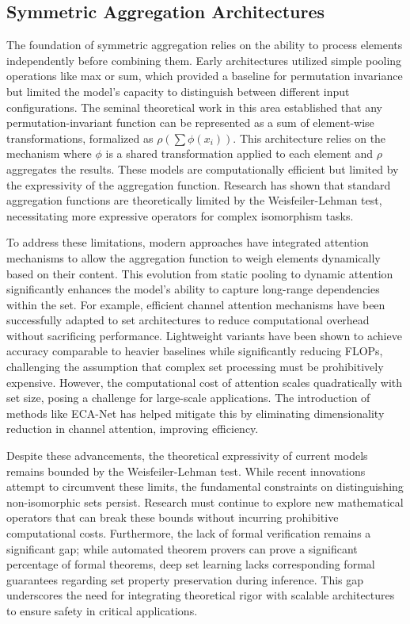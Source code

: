 \documentclass{article}
\begin{document}
\label{sec:detailed_review_of_approaches}

\subsection{Symmetric Aggregation Architectures}

\label{sec:symmetric_aggregation_architectures}

The foundation of symmetric aggregation relies on the ability to process elements independently before combining them. Early architectures utilized simple pooling operations like max or sum, which provided a baseline for permutation invariance but limited the model's capacity to distinguish between different input configurations. The seminal theoretical work in this area established that any permutation-invariant function can be represented as a sum of element-wise transformations, formalized as $\rho(\sum \phi(x_i))$. This architecture relies on the mechanism where $\phi$ is a shared transformation applied to each element and $\rho$ aggregates the results. These models are computationally efficient but limited by the expressivity of the aggregation function. Research has shown that standard aggregation functions are theoretically limited by the Weisfeiler-Lehman test, necessitating more expressive operators for complex isomorphism tasks.

To address these limitations, modern approaches have integrated attention mechanisms to allow the aggregation function to weigh elements dynamically based on their content. This evolution from static pooling to dynamic attention significantly enhances the model's ability to capture long-range dependencies within the set. For example, efficient channel attention mechanisms have been successfully adapted to set architectures to reduce computational overhead without sacrificing performance. Lightweight variants have been shown to achieve accuracy comparable to heavier baselines while significantly reducing FLOPs, challenging the assumption that complex set processing must be prohibitively expensive. However, the computational cost of attention scales quadratically with set size, posing a challenge for large-scale applications. The introduction of methods like ECA-Net has helped mitigate this by eliminating dimensionality reduction in channel attention, improving efficiency.

Despite these advancements, the theoretical expressivity of current models remains bounded by the Weisfeiler-Lehman test. While recent innovations attempt to circumvent these limits, the fundamental constraints on distinguishing non-isomorphic sets persist. Research must continue to explore new mathematical operators that can break these bounds without incurring prohibitive computational costs. Furthermore, the lack of formal verification remains a significant gap; while automated theorem provers can prove a significant percentage of formal theorems, deep set learning lacks corresponding formal guarantees regarding set property preservation during inference. This gap underscores the need for integrating theoretical rigor with scalable architectures to ensure safety in critical applications.
\end{document}
